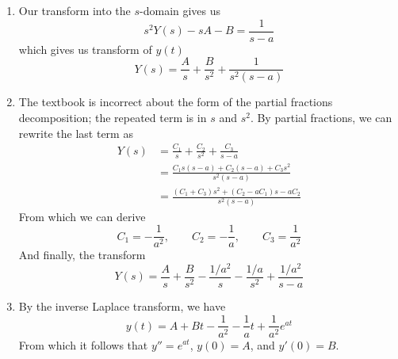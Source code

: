 \documentclass[a4paper]{article}
\begin{document}

\begin{enumerate}[label=(\alph*)]
	\item Our transform into the \( s  \)-domain gives us
	\[
		s^{2}Y \!\left( s  \right) - sA - B = \frac{1}{s - a} 
	\]
	which gives us transform of \( y \!\left( t  \right) \)
	\[
		Y \!\left( s  \right) = \frac{A }{s } + \frac{B }{s^{2}} + \frac{1}{s^{2}\!\left( s - a  \right)}
	\]
	\item The textbook is incorrect about the form of the partial fractions decomposition; the repeated term is in \( s  \) and \( s^{2} \).
	By partial fractions, we can rewrite the last term as 
	\begin{align*}
                 Y \!\left( s  \right) & = \frac{C_{1}}{s } + \frac{C_{2}}{s^{2}} + \frac{C_{3}}{s - a} \\
				       & = \frac{C_{1} s \!\left( s - a  \right) + C_{2} \!\left( s - a  \right) + C_{3}s^{2}}{s^{2}\!\left( s - a \right)} \\
				       & = \frac{\!\left( C_{1} + C_{3} \right)s^{2} + \!\left( C_{2} - a C_{1} \right)s - a C_{2}}{s^{2}\!\left( s - a \right)}
	\end{align*}
	From which we can derive
	\[
		C_{1} = - \frac{1}{a^{2}}, \qquad C_{2} = - \frac{1}{a }, \qquad C_{3} = \frac{1}{a^{2}} 
	\]
	And finally, the transform
	\[
		Y \!\left( s \right) = \frac{A }{s } + \frac{B }{s^{2}} - \frac{1 / a^{2}}{s } - \frac{1 / a}{s^{2}} + \frac{1/a^{2}}{s - a}
	\]
	\item By the inverse Laplace transform, we have
	\[
		y \!\left( t  \right) = A + Bt - \frac{1}{a^{2}} - \frac{1}{a }t + \frac{1}{a^{2}}e^{at} 
	\]
	From which it follows that \( y'' = e^{at } \), \( y \!\left( 0 \right) = A  \), and \( y'\!\left( 0 \right) = B  \).
\end{enumerate}
\end{document}
